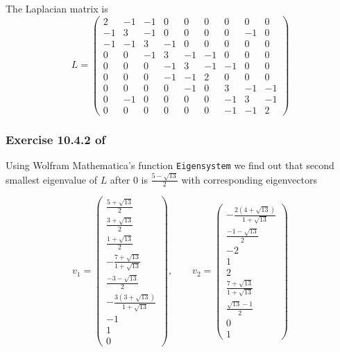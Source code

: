 \documentclass{article}
\begin{document}
The Laplacian matrix is
\begin{equation*}
    L = \begin{pmatrix}
        2 & -1 & -1 & 0 & 0 & 0 & 0 & 0 & 0\\
        -1 & 3 & -1 & 0 & 0 & 0 & 0 & -1 & 0\\
        -1 & -1 & 3 & -1 & 0 & 0 & 0 & 0 & 0\\
        0 & 0 & -1 & 3 & -1 & -1 & 0 & 0 & 0\\
        0 & 0 & 0 & -1 & 3 & -1 & -1 & 0 & 0\\
        0 & 0 & 0 & -1 & -1 & 2 & 0 & 0 & 0\\
        0 & 0 & 0 & 0 & -1 & 0 & 3 & -1 & -1\\
        0 & -1 & 0 & 0 & 0 & 0 & -1 & 3 & -1\\
        0 & 0 & 0 & 0 & 0 & 0 & -1 & -1 & 2
    \end{pmatrix}
\end{equation*}


\subsubsection*{Exercise 10.4.2 of \cite{mmds}}

Using Wolfram Mathematica's function \verb|Eigensystem|
we find out that second smallest eigenvalue of \(L\) after 0 is
\(\frac{5 - \sqrt{13}}{2}\) with corresponding eigenvectors

\begin{equation*}    
v_1 = \begin{pmatrix}
    \frac{5+\sqrt{13}}{2} \\ \frac{3+\sqrt{13}}{2} \\ \frac{1+\sqrt{13}}{2}
    \\ -\frac{7+\sqrt{13}}{1+\sqrt{13}} \\
    \frac{-3-\sqrt{13}}{2} \\ 
    -\frac{3\left(3+\sqrt{13}\right)}{1+\sqrt{13}} \\ -1 \\ 1 \\ 0
\end{pmatrix}
,\qquad
v_2 = \begin{pmatrix}
    -\frac{2 \left(4+\sqrt{13}\right)}{1+\sqrt{13}} \\
    \frac{-1-\sqrt{13}}{2} \\ -2 \\ 1 \\ 2 \\
    \frac{7+\sqrt{13}}{1+\sqrt{13}} \\ 
    \frac{\sqrt{13}-1}{2} \\ 0 \\ 1
\end{pmatrix}
\end{equation*}
\end{document}
